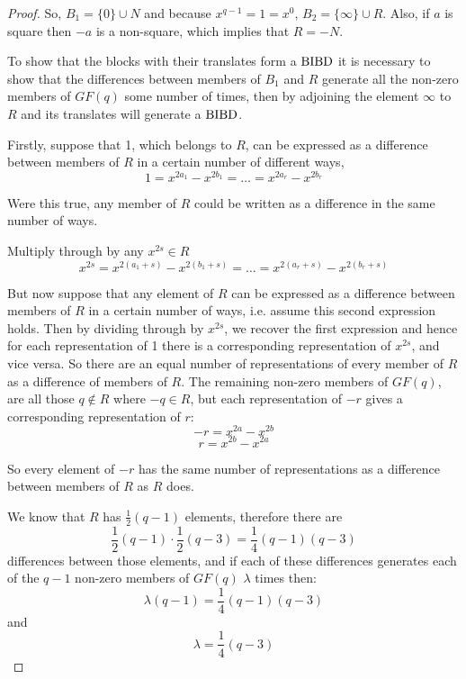 \begin{proof}
So, $B_1 = \{0\} \cup N$ and because $x^{q - 1} = 1 = x^0$, $B_2 = \{\infty\} \cup R$.
Also, if $a$ is square then $-a$ is a non-square, which implies that $R = -N$.

To show that the blocks with their translates form a $\operatorname{BIBD}$ it is necessary to show that the differences between members of $B_1$ and $R$ generate all the non-zero members of $GF(q)$ some number of times, then by adjoining the element $\infty$ to $R$ and its translates will generate a $\operatorname{BIBD}$.

Firstly, suppose that 1, which belongs to $R$, can be expressed as a difference between members of $R$ in a certain number of different ways,
\begin{equation}
1 = x^{2a_1} - x^{2b_1} = \ldots = x^{2a_r} - x^{2b_r}
\end{equation}

Were this true, any member of $R$ could be written as a difference in the same number of ways.

Multiply through by any $x^{2s} \in R$
\begin{equation}
x^{2s} = x^{2(a_1 + s)} - x^{2(b_1 + s)} = \ldots = x^{2(a_r + s)} - x^{2(b_r + s)}
\end{equation}

But now suppose that any element of $R$ can be expressed as a difference between members of $R$ in a certain number of ways, i.e. assume this second expression holds.
Then by dividing through by $x^{2s}$, we recover the first expression and hence for each representation of 1 there is a corresponding representation of $x^{2s}$, and vice versa.
So there are an equal number of representations of every member of $R$ as a difference of members of $R$.
The remaining non-zero members of $GF(q)$, are all those $q \notin R$ where $-q \in R$, but each representation of $-r$ gives a corresponding representation of $r$:
\begin{equation}
-r = x^{2a} - x^{2b}
\end{equation}
\begin{equation}
r = x^{2b} - x^{2a}
\end{equation}

So every element of $-r$ has the same number of representations as a difference between members of $R$ as $R$ does.

We know that $R$ has $\frac{1}{2}(q-1)$ elements, therefore there are
\begin{equation}
\frac{1}{2}(q-1) \cdot \frac{1}{2} (q-3) = \frac{1}{4}(q-1)(q-3)
\end{equation}
differences between those elements,
and if each of these differences generates each of the $q-1$ non-zero members of $GF(q)$ $\lambda$ times then:
\begin{equation}
\lambda(q - 1) = \frac{1}{4}(q - 1)(q - 3)
\end{equation}
and
\begin{equation}
\lambda = \frac{1}{4}(q - 3)
\end{equation}


\end{proof}
